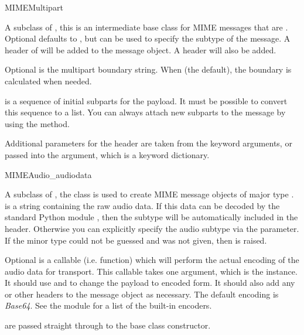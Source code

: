 \begin{classdesc}{MIMEMultipart}{}

A subclass of , this is an intermediate base class for
MIME messages that are .  Optional 
defaults to , but can be used to specify the subtype
of the message.  A  header of
 will be added to the message
object.  A  header will also be added.

Optional  is the multipart boundary string.  When
 (the default), the boundary is calculated when needed.

 is a sequence of initial subparts for the payload.  It
must be possible to convert this sequence to a list.  You can always
attach new subparts to the message by using the
 method.

Additional parameters for the  header are
taken from the keyword arguments, or passed into the 
argument, which is a keyword dictionary.

\end{classdesc}

\begin{classdesc}{MIMEAudio}{_audiodata}

A subclass of , the  class
is used to create MIME message objects of major type .
 is a string containing the raw audio data.  If this
data can be decoded by the standard Python module ,
then the subtype will be automatically included in the
 header.  Otherwise you can explicitly specify the
audio subtype via the  parameter.  If the minor type could
not be guessed and  was not given, then 
is raised.

Optional  is a callable (i.e. function) which will
perform the actual encoding of the audio data for transport.  This
callable takes one argument, which is the  instance.
It should use  and  to
change the payload to encoded form.  It should also add any
 or other headers to the message
object as necessary.  The default encoding is \emph{Base64}.  See the
 module for a list of the built-in encoders.

 are passed straight through to the base class constructor.
\end{classdesc}

